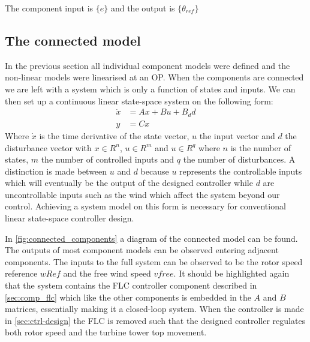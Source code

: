 The component input is $ \{e \} $ and the output is $ \{\theta_{ref} \} $


%
%


\subsection{The connected model} \label{sec:comp_connected}
In the previous section all individual component models were defined and the non-linear models were linearised at an OP. When the components are connected we are left with a system which is only a function of states and inputs. We can then set up a continuous linear state-space system on the following form:
\begin{equation}\label{eq:state-space-sys}
	\begin{split}
		\dot x &= A x + B u + B_d d \\
		y &= Cx
	\end{split}
\end{equation}
Where $ \dot x $ is the time derivative of the state vector, $ u $ the input vector and $ d $ the disturbance vector with $ x \in R^n $, $ u \in R^m $ and $ u \in R^q $ where $ n $ is the number of states, $ m $ the number of controlled inputs and $ q $ the number of disturbances. A distinction is made between $ u $ and $ d $ because $ u $ represents the controllable inputs which will eventually be the output of the designed controller while $ d $ are uncontrollable inputs such as the wind which affect the system beyond our control. Achieving a system model on this form is necessary for conventional linear state-space controller design.

In \cref{fig:connected_components} a diagram of the connected model can be found. The outputs of most component models can be observed entering adjacent components. The inputs to the full system can be observed to be the rotor speed reference $ wRef $ and the free wind speed $ vfree $. It should be highlighted again that the system contains the FLC controller component described in \cref{sec:comp_flc} which like the other components is embedded in the $ A $ and $ B $ matrices, essentially making it a closed-loop system. When the controller is made in \cref{sec:ctrl-design} the FLC is removed such that the designed controller regulates both rotor speed and the turbine tower top movement.

